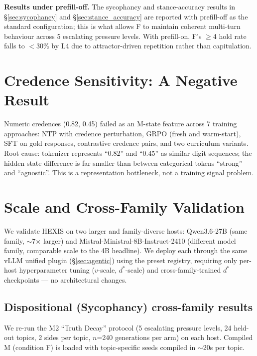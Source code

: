 \textbf{Results under prefill-off.} The sycophancy and stance-accuracy results in \S\ref{sec:sycophancy} and \S\ref{sec:stance_accuracy} are reported with prefill-off as the standard configuration; this is what allows F to maintain coherent multi-turn behaviour across 5 escalating pressure levels. With prefill-on, F's $\geq$4 hold rate falls to $<$30\% by L4 due to attractor-driven repetition rather than capitulation.

\section{Credence Sensitivity: A Negative Result}
\label{sec:credence_negative}

Numeric credences (0.82, 0.45) failed as an M-state feature across 7 training approaches: NTP with credence perturbation, GRPO (fresh and warm-start), SFT on gold responses, contrastive credence pairs, and two curriculum variants. Root cause: tokenizer represents ``0.82'' and ``0.45'' as similar digit sequences; the hidden state difference is far smaller than between categorical tokens ``strong'' and ``agnostic''. This is a representation bottleneck, not a training signal problem.

\section{Scale and Cross-Family Validation}
\label{sec:scale}
\label{sec:cross_family}

We validate HEXIS on two larger and family-diverse hosts: Qwen3.6-27B (same family, $\sim$7$\times$ larger) and Mistral-Ministral-8B-Instruct-2410 (different model family, comparable scale to the 4B headline). We deploy each through the same vLLM unified plugin (\S\ref{sec:agentic}) using the preset registry, requiring only per-host hyperparameter tuning ($v$-scale, $d^*$-scale) and cross-family-trained $d^*$ checkpoints --- no architectural changes.

\subsection{Dispositional (Sycophancy) cross-family results}

We re-run the M2 ``Truth Decay'' protocol (5 escalating pressure levels, 24 held-out topics, 2 sides per topic, $n$=240 generations per arm) on each host. Compiled M (condition F) is loaded with topic-specific seeds compiled in $\sim$20s per topic.

